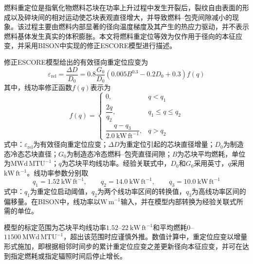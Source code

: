 燃料重定位是指氧化物燃料芯块在功率上升过程中发生开裂后，裂纹自由表面的形成以及碎块间的相对运动使芯块表观直径增大，并导致燃料--包壳间隙减小的现象。该过程主要由燃料内部显著的径向温度梯度及其产生的热应力驱动，并不表示燃料基体发生真实的体积膨胀。本文将燃料重定位等效为仅作用于径向的本征应变，并采用BISON中实现的修正ESCORE模型进行描述\cite{fancherESCOREEPRISteadystate1987,halesBISONTheoryManual2016}。

修正ESCORE模型给出的有效径向重定位应变为
\begin{equation}
	\varepsilon_{\mathrm{rel}}
	=
	\frac{\Delta D}{D_0}
	=
	0.8\frac{G_0}{D_0}
	\left(
	0.005B^{0.3}-0.2D_0+0.3
	\right)f(q)
	\label{eq:escore_relocation_strain}
\end{equation}
其中，线功率修正函数$f(q)$表示为
\begin{equation}
	f(q)=
	\begin{cases}
		0,
		& q<q_1\\[4pt]
		\dfrac{2q}{q_2},
		& q_1\leq q\leq q_2\\[8pt]
		\dfrac{q-q_3}
		{2.0\ \mathrm{kW\,ft^{-1}}},
		& q>q_2
	\end{cases}
	\label{eq:escore_relocation_power_function}
\end{equation}
式中：$\varepsilon_{\mathrm{rel}}$为有效径向重定位应变；$\Delta D$为重定位引起的芯块直径增量；$D_0$为制造态冷态芯块直径；$G_0$为制造态冷态燃料--包壳直径间隙；$B$为芯块平均燃耗，单位为$\mathrm{MWd\,MTU^{-1}}$；$q$为芯块平均线功率。经验关联式中，$D_0$和$G_0$采用英寸，$q$采用$\mathrm{kW\,ft^{-1}}$。线功率参数分别取
\begin{equation}
	q_1=1.52\ \mathrm{kW\,ft^{-1}},\qquad
	q_2=14.0\ \mathrm{kW\,ft^{-1}},\qquad
	q_3=10.0\ \mathrm{kW\,ft^{-1}}
\end{equation}
式中：$q_1$为重定位启动阈值，$q_2$为两个线功率区间的转换值，$q_3$为高线功率区间的偏移量。在BISON中，线功率以$\mathrm{W\,m^{-1}}$输入，并在模型内部转换为经验关联式所需的单位。

模型的标定范围为芯块平均线功率$1.52$--$22\ \mathrm{kW\,ft^{-1}}$和平均燃耗$0$--$11500\ \mathrm{MWd\,MTU^{-1}}$，超出该范围时应谨慎外推。数值计算中，重定位应变以增量形式施加，即根据相邻时间步的累计重定位应变之差更新径向本征应变，并可在达到指定燃耗或指定辐照时间后停止增长。


